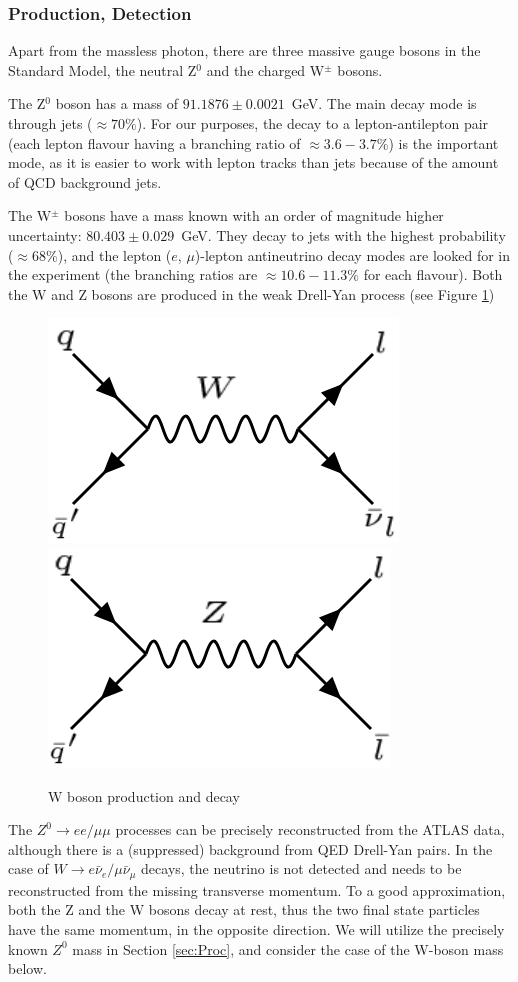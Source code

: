 \documentclass[twocolumn]{article}
\begin{document}
\subsubsection{Production, Detection}
Apart from the massless photon, there are three massive gauge bosons in the Standard Model, the neutral Z$^0$ and the charged W$^\pm$ bosons.
\par The Z$^0$ boson has a mass of $91.1876 \pm 0.0021$~GeV. The main decay mode is through jets ($\approx 70\%$). For our purposes, the decay to a lepton-antilepton pair (each lepton flavour having a branching ratio of $\approx 3.6-3.7 \%$) is the important mode, as it is easier to work with lepton tracks than jets because of the amount of QCD background jets.
\par The W$^\pm$ bosons have a mass known with an order of magnitude higher uncertainty: $80.403 \pm 0.029$~GeV. They decay to jets with the highest probability ($\approx 68 \%$), and the lepton ($e$, $\mu$)-lepton antineutrino decay modes are looked for in the experiment (the branching ratios are $\approx 10.6-11.3\%$ for each flavour).
Both the W and Z bosons are produced in the weak Drell-Yan process (see Figure \ref{fig:WDiagram})
\begin{figure}
\includegraphics[scale=0.33]{Images/WDiagram.png}
\includegraphics[scale=0.33]{Images/ZDiagram_differentflavour.png}
\caption{W boson production and decay}
\label{fig:WDiagram}
\end{figure}
The $Z^0 \rightarrow ee/\mu\mu$ processes can be precisely reconstructed from the ATLAS data, although there is a (suppressed) background from QED Drell-Yan pairs. In the case of $W \rightarrow e \bar{\nu}_e/\mu \bar{\nu}_\mu$ decays, the neutrino is not detected and needs to be reconstructed from the missing transverse momentum. To a good approximation, both the Z and the W bosons decay at rest, thus the two final state particles have the same momentum, in the opposite direction. We will utilize the precisely known $Z^0$ mass in Section \ref{sec:Proc}, and consider the case of the W-boson mass below. 
\end{document}

